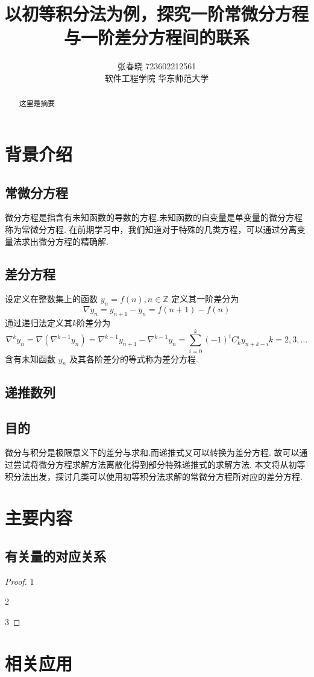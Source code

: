 \documentclass{sjtureport}
\title{以初等积分法为例，探究一阶常微分方程与一阶差分方程间的联系}
\author{张春晓 723602212561 \\ 软件工程学院 \quad{} 华东师范大学}
\begin{document}
  \maketitle

  \begin{abstract}
    这里是摘要
  \end{abstract}

  \tableofcontents

  \chapter{背景介绍}
  \section{常微分方程}
  微分方程是指含有未知函数的导数的方程.未知函数的自变量是单变量的微分方程称为常微分方程.\cite{Zhang2015}
  在前期学习中，我们知道对于特殊的几类方程，可以通过分离变量法求出微分方程的精确解. \\

  \section{差分方程}
  设定义在整数集上的函数 $y_{n}=f(n), n \in \mathbb{Z}$ 定义其一阶差分为
  $$
  \nabla y_n = y_{n+1} - y_{n} = f(n+1) - f(n)
  $$
  通过递归法定义其$k$阶差分为
  $$
  \nabla^k y_n =\nabla (\nabla^{k-1} y_n) =\nabla^{k-1}y_{n+1}-\nabla^{k-1}y_n=\sum_{i=0}^k(-1)^iC_k^iy_{n+k-i}
  k=2,3,\dots
  $$
  含有未知函数 $y_n$ 及其各阶差分的等式称为差分方程.\cite{ECNU2022}

  \section{递推数列}

  \section{目的}
  微分与积分是极限意义下的差分与求和.而递推式又可以转换为差分方程.
  故可以通过尝试将微分方程求解方法离散化得到部分特殊递推式的求解方法.
  本文将从初等积分法出发，探讨几类可以使用初等积分法求解的常微分方程所对应的差分方程.

  \chapter{主要内容}

  \section{有关量的对应关系}

  \begin{proof}
    1

    2

    3
  \end{proof}

  \chapter{相关应用}

  \printbibliography
\end{document}
